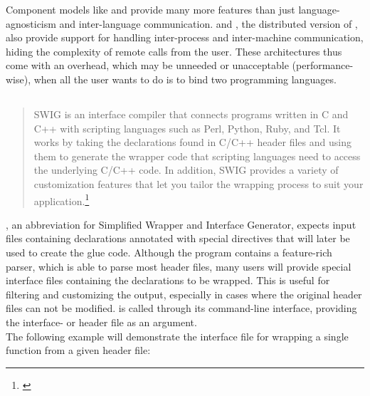 
Component models like  and  provide many more features than just language-agnosticism and inter-language communication.  and , the distributed version of , also provide support for handling inter-process and inter-machine communication, hiding the complexity of remote calls from the user. These architectures thus come with an overhead, which may be unneeded or unacceptable (performance-wise), when all the user wants to do is to bind two programming languages.


\newpage
\subsection{}

\begin{quotation}
SWIG is an interface compiler that connects programs written in C and C++ with scripting languages such as Perl, Python, Ruby, and Tcl. It works by taking the declarations found in C/C++ header files and using them to generate the wrapper code that scripting languages need to access the underlying C/C++ code. In addition, SWIG provides a variety of customization features that let you tailor the wrapping process to suit your application.\footnote{\citep{SWIGHPExec}}
\end{quotation}


, an abbreviation for Simplified Wrapper and Interface Generator, expects input files containing  declarations annotated with special  directives that will later be used to create the glue code. Although the program contains a feature-rich  parser, which is able to parse most  header files, many users will provide special  interface files containing the declarations to be wrapped. This is useful for filtering and customizing the output, especially in cases where the original header files can not be modified.  is called through its command-line interface, providing the interface- or header file as an argument.
\\The following example will demonstrate the interface file for wrapping a single function from a given header file:

